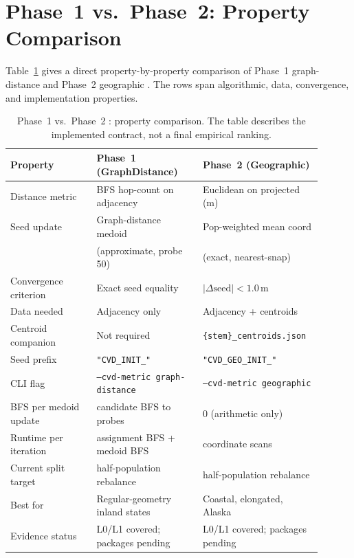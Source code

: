 \section{Phase~1 vs.\ Phase~2: Property Comparison}
\label{sec:comparison-overview}

Table~\ref{tab:phase-compare} gives a direct property-by-property comparison
of Phase~1 graph-distance \cvd{} and Phase~2 geographic \cvdgeo{}.
The rows span algorithmic, data, convergence, and implementation properties.

\begin{table}[t]
\centering
\caption{%
  Phase~1 \cvd{} vs.\ Phase~2 \cvdgeo{}: property comparison.
  The table describes the implemented contract, not a final empirical ranking.
}
\label{tab:phase-compare}
\renewcommand{\arraystretch}{1.3}
\small
\begin{tabular}{@{}p{0.26\linewidth}p{0.32\linewidth}p{0.32\linewidth}@{}}
\toprule
Property & Phase~1 (GraphDistance) & Phase~2 (Geographic) \\
\midrule
Distance metric        & BFS hop-count on adjacency & Euclidean on projected (m) \\
Seed update            & Graph-distance medoid       & Pop-weighted mean coord \\
                       & (approximate, probe 50)     & (exact, nearest-snap) \\
Convergence criterion  & Exact seed equality         & $|\Delta\mathrm{seed}| < 1.0$\,m \\
Data needed            & Adjacency only              & Adjacency + centroids \\
Centroid companion     & Not required                & \texttt{\{stem\}\_centroids.json} \\
Seed prefix            & \texttt{"CVD\_INIT\_"}      & \texttt{"CVD\_GEO\_INIT\_"} \\
CLI flag               & \texttt{--cvd-metric graph-distance} & \texttt{--cvd-metric geographic} \\
\midrule
BFS per medoid update  & candidate BFS to probes     & 0 (arithmetic only) \\
Runtime per iteration  & assignment BFS + medoid BFS & coordinate scans \\
Current split target   & half-population rebalance   & half-population rebalance \\
\midrule
Best for               & Regular-geometry inland states & Coastal, elongated, Alaska \\
Evidence status        & L0/L1 covered; packages pending & L0/L1 covered; packages pending \\
\bottomrule
\end{tabular}
\normalsize
\end{table}

